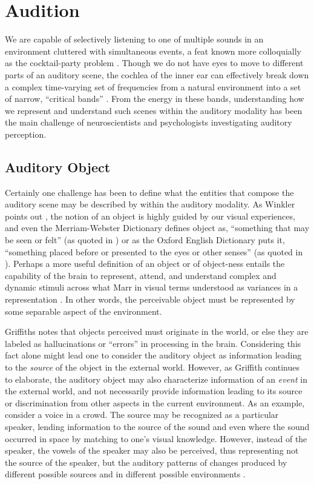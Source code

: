 \section{Audition}

We are capable of selectively listening to one of multiple sounds in an environment cluttered with simultaneous events, a feat known more colloquially as the cocktail-party problem \cite{McDermott2009}.  Though we do not have eyes to move to different parts of an auditory scene, the cochlea of the inner ear can effectively break down a complex time-varying set of frequencies from a natural environment into a set of narrow, ``critical bands'' \cite{Fletcher1940}.  From the energy in these bands, understanding how we represent and understand such scenes within the auditory modality has been the main challenge of neuroscientists and psychologists investigating auditory perception.  

\subsection{Auditory Object}

Certainly one challenge has been to define what the entities that compose the auditory scene may be described by within the auditory modality.  As Winkler points out \cite{Ist2010}, the notion of an object is highly guided by our visual experiences, and even the Merriam-Webster Dictionary defines object as, ``something that may be seen or felt'' (as quoted in \cite{Ist2010}) or as the Oxford English Dictionary puts it, ``something placed before or presented to the eyes or other senses'' (as quoted in \cite{Griffiths2004}).  Perhaps a more useful definition of an object or of object-ness entails the capability of the brain to represent, attend, and understand complex and dynamic stimuli across what Marr in visual terms understood as variances in a representation \cite{Marr1982}.  In other words, the perceivable object must be represented by some separable aspect of the environment.  

Griffiths notes that objects perceived must originate in the world, or else they are labeled as hallucinations or ``errors'' in processing in the brain.  Considering this fact alone might lead one to consider the auditory object as information leading to the \textit{source} of the object in the external world.  However, as Griffith continues to elaborate, the auditory object may also characterize information of an \textit{event} in the external world, and not necessarily provide information leading to its source or discrimination from other aspects in the current environment.  As an example, consider a voice in a crowd.  The source may be recognized as a particular speaker, lending information to the source of the sound and even where the sound occurred in space by matching to one's visual knowledge.  However, instead of the speaker, the vowels of the speaker may also be perceived, thus representing not the source of the speaker, but the auditory patterns of changes produced by different possible sources and in different possible environments \cite{Griffiths2004}.  

